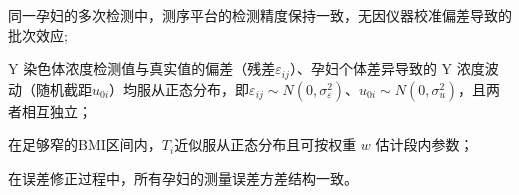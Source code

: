 %

\begin{compactitem}
    \item 同一孕妇的多次检测中，测序平台的检测精度保持一致，无因仪器校准偏差导致的批次效应;
    \item Y 染色体浓度检测值与真实值的偏差（残差\(\varepsilon_{ij}\)）、孕妇个体差异导致的 Y 浓度波动（随机截距\(u_{0i}\)）均服从正态分布，即\(\varepsilon_{ij} \sim N(0,\sigma_{\varepsilon}^2)\)、\(u_{0i} \sim N(0,\sigma_{u}^2)\)，且两者相互独立；
    \item 在足够窄的BMI区间内，${T_i}$近似服从正态分布且可按权重 $w$ 估计段内参数；
    \item  在误差修正过程中，所有孕妇的测量误差方差结构一致。
\end{compactitem}



